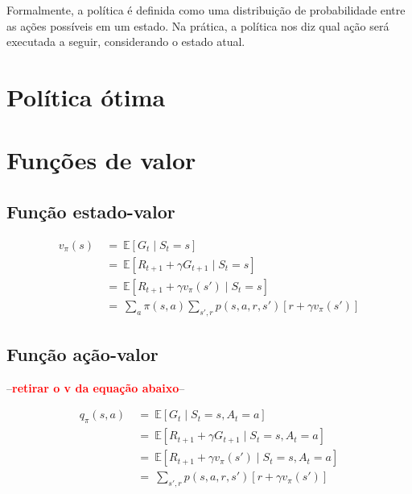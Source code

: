 \documentclass{article}
\newcommand{\todo}[1]{ --\textcolor{red}{\textbf{#1}}--}
\begin{document}
        Formalmente, a política é definida como uma distribuição de probabilidade entre as ações possíveis em um estado. Na prática, a política nos diz qual ação será executada a seguir, considerando o estado atual.
    
        \section{Política ótima}
        
    
    \section{Funções de valor}
        
        \subsection{Função estado-valor}
        
            \begin{equation}
            \begin{split}
                v_{\pi}(s) & \ = \ \mathbb{E}[G_t \mid S_t = s] \\
                & \ = \ \mathbb{E}[R_{t+1} + \gamma G_{t+1} \mid S_t = s] \\
                & \ = \ \mathbb{E}[R_{t+1} + \gamma v_{\pi}(s') \mid S_t = s] \\
                & \ = \ \sum_{a} \pi(s,a) \sum_{s', r} p(s, a, r, s') [r + \gamma v_{\pi}(s')]
            \end{split}
            \end{equation}
        
        \subsection{Função ação-valor}
        
            \todo{retirar o v da equação abaixo}

            \begin{equation}            
            \begin{split}
                q_{\pi}(s, a) & \ = \ \mathbb{E}[G_t \mid S_t = s, A_t = a] \\
                & \ = \ \mathbb{E}[R_{t+1} + \gamma G_{t+1} \mid S_t = s, A_t = a] \\
                & \ = \ \mathbb{E}[R_{t+1} + \gamma v_{\pi}(s') \mid S_t = s, A_t = a] \\
                & \ = \ \sum_{s', r} p(s, a, r, s') [r + \gamma v_{\pi}(s')]
            \end{split}
            \end{equation}
        
\end{document}

